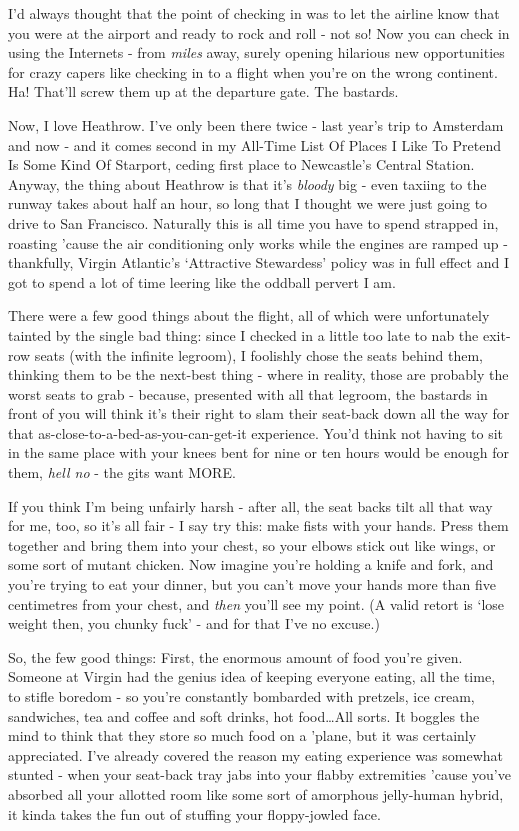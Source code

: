 \documentclass[b5paper,11pt,titlepage,draft]{book}
\begin{document}
I'd always thought that the point of checking in was to let the airline know that you were at the airport and ready to rock and roll - not so!  Now you can check in using the Internets - from \emph{miles} away, surely opening hilarious new opportunities for crazy capers like checking in to a flight when you're on the wrong continent.  Ha!  That'll screw them up at the departure gate.  The bastards.

Now, I love Heathrow.  I've only been there twice - last year's trip to Amsterdam and now - and it comes second in my All-Time List Of Places I Like To Pretend Is Some Kind Of Starport, ceding first place to Newcastle's Central Station.  Anyway, the thing about Heathrow is that it's \emph{bloody} big - even taxiing to the runway takes about half an hour, so long that I thought we were just going to drive to San Francisco.  Naturally this is all time you have to spend strapped in, roasting 'cause the air conditioning only works while the engines are ramped up - thankfully, Virgin Atlantic's `Attractive Stewardess' policy was in full effect and I got to spend a lot of time leering like the oddball pervert I am.

There were a few good things about the flight, all of which were unfortunately tainted by the single bad thing: since I checked in a little too late to nab the exit-row seats (with the infinite legroom), I foolishly chose the seats behind them, thinking them to be the next-best thing - where in reality, those are probably the worst seats to grab - because, presented with all that legroom, the bastards in front of you will think it's their right to slam their seat-back down all the way for that as-close-to-a-bed-as-you-can-get-it experience.  You'd think not having to sit in the same place with your knees bent for nine or ten hours would be enough for them, \emph{hell no} - the gits want MORE.

If you think I'm being unfairly harsh - after all, the seat backs tilt all that way for me, too, so it's all fair - I say try this:  make fists with your hands.  Press them together and bring them into your chest, so your elbows stick out like wings, or some sort of mutant chicken.  Now imagine you're holding a knife and fork, and you're trying to eat your dinner, but you can't move your hands more than five centimetres from your chest, and \emph{then} you'll see my point.  (A valid retort is `lose weight then, you chunky fuck' - and for that I've no excuse.)

So, the few good things:  First, the enormous amount of food you're given.  Someone at Virgin had the genius idea of keeping everyone eating, all the time, to stifle boredom - so you're constantly bombarded with pretzels, ice cream, sandwiches, tea and coffee and soft drinks, hot food\ldots  All sorts.  It boggles the mind to think that they store so much food on a 'plane, but it was certainly appreciated.  I've already covered the reason my eating experience was somewhat stunted - when your seat-back tray jabs into your flabby extremities 'cause you've absorbed all your allotted room like some sort of amorphous jelly-human hybrid, it kinda takes the fun out of stuffing your floppy-jowled face.
\end{document}

